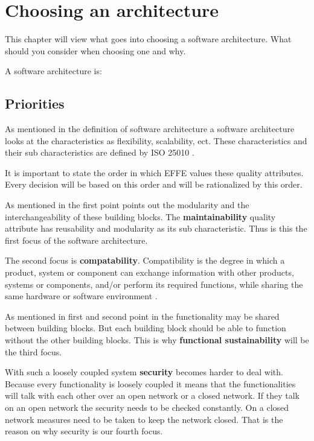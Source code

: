 \chapter{Choosing an architecture}
\label{sec:ChoosingArchitecture}

This chapter will view what goes into choosing a software architecture. What should you consider when choosing one and why.

A software architecture is:


\section{Priorities}

As mentioned in the definition of software architecture  a software architecture looks at the characteristics as flexibility, scalability, ect. These characteristics and their sub characteristics are defined by ISO 25010 \cite{iso25010}.

It is important to state the order in which EFFE values these quality attributes. Every decision will be based on this order and will be rationalized by this order.

As mentioned in  the first point points out the modularity and the interchangeability of these building blocks. The \textbf{maintainability} quality attribute has reusability and modularity as its sub characteristic. Thus is this the first focus of the software architecture.

The second focus is \textbf{compatability}. Compatibility is the degree in which a product, system or component can exchange information with other products, systems or components, and/or perform its required functions, while sharing the same hardware or software environment \cite{iso25010}.

As mentioned in first and second point in  the functionality may be shared between building blocks. But each building block should be able to function without the other building blocks. This is why \textbf{functional sustainability} will be the third focus.

With such a loosely coupled system \textbf{security} becomes harder to deal with. Because every functionality is loosely coupled it means that the functionalities will talk with each other over an open network or a closed network. If they talk on an open network the security needs to be checked constantly. On a closed network measures need to be taken to keep the network closed. That is the reason on why security is our fourth focus.

